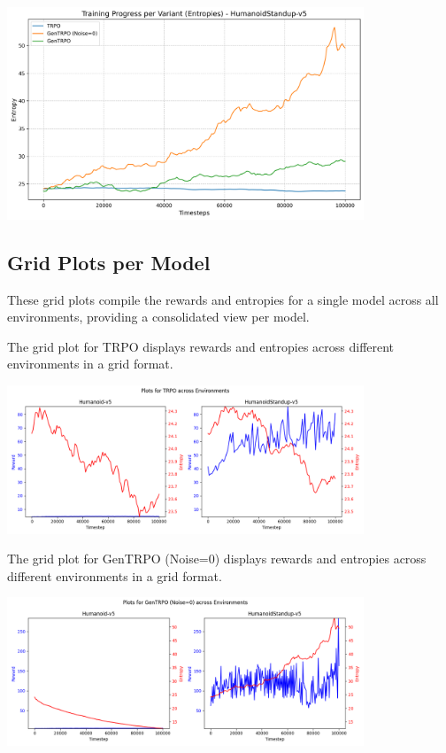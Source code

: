 \documentclass{svproc}
\begin{document}
\begin{center}
\includegraphics[width=0.8\textwidth]{graph_entropies_HumanoidStandup-v5.png}
\end{center}

\subsection{Grid Plots per Model}
These grid plots compile the rewards and entropies for a single model across all environments, providing a consolidated view per model.

The grid plot for TRPO displays rewards and entropies across different environments in a grid format.

\begin{center}
\includegraphics[width=0.8\textwidth]{grid_model_trpo.png}
\end{center}

The grid plot for GenTRPO (Noise=0) displays rewards and entropies across different environments in a grid format.

\begin{center}
\includegraphics[width=0.8\textwidth]{grid_model_gentrpo.png}
\end{center}
\end{document}
